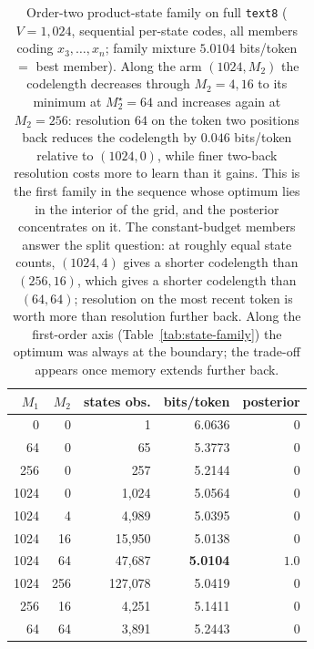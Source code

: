 \documentclass[11pt]{article}
\begin{document}
\begin{table}[ht]
\centering
\begin{tabular}{rrrrr}
\toprule
$M_1$ & $M_2$ & states obs. & bits/token & posterior \\
\midrule
    0 &    0 &        1 & 6.0636 & $0$ \\
   64 &    0 &       65 & 5.3773 & $0$ \\
  256 &    0 &      257 & 5.2144 & $0$ \\
 1024 &    0 &    1{,}024 & 5.0564 & $0$ \\
 1024 &    4 &    4{,}989 & 5.0395 & $0$ \\
 1024 &   16 &   15{,}950 & 5.0138 & $0$ \\
 1024 &   64 &   47{,}687 & \textbf{5.0104} & $1.0$ \\
 1024 &  256 &  127{,}078 & 5.0419 & $0$ \\
  256 &   16 &    4{,}251 & 5.1411 & $0$ \\
   64 &   64 &    3{,}891 & 5.2443 & $0$ \\
\bottomrule
\end{tabular}
\caption{Order-two product-state family on full \texttt{text8}
  ($V=1{,}024$, sequential per-state codes, all members coding
  $x_3,\dots,x_n$; family mixture $5.0104$ bits/token $=$ best member).
  Along the arm $(1024, M_2)$ the codelength decreases through
  $M_2 = 4, 16$ to its minimum at $M_2^\star = 64$ and increases again
  at $M_2 = 256$: resolution $64$ on the token two positions back
  reduces the codelength by $0.046$ bits/token relative to $(1024,0)$,
  while finer two-back resolution costs more to learn than it gains.
  This is the first family in the sequence whose optimum lies in the
  interior of the grid, and the posterior concentrates on it.  The
  constant-budget members answer the split question: at roughly equal
  state counts, $(1024,4)$ gives a shorter codelength than $(256,16)$,
  which gives a shorter codelength than $(64,64)$; resolution on the
  most recent token is worth more than resolution further back.  Along
  the first-order axis (Table~\ref{tab:state-family}) the optimum was
  always at the boundary; the trade-off appears once memory extends
  further back.}
\label{tab:product-family}
\end{table}
\end{document}
